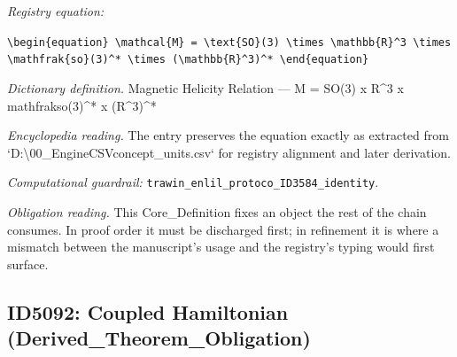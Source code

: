 \documentclass[11pt]{article}
\theoremstyle{remark}
\begin{document}
\noindent\textit{Registry equation:}\par
{\small\texttt{\textbackslash{}begin\{equation\} \textbackslash{}mathcal\{M\} = \textbackslash{}text\{SO\}(3) \textbackslash{}times \textbackslash{}mathbb\{R\}\textasciicircum{}3 \textbackslash{}times \textbackslash{}mathfrak\{so\}(3)\textasciicircum{}* \textbackslash{}times (\textbackslash{}mathbb\{R\}\textasciicircum{}3)\textasciicircum{}* \textbackslash{}end\{equation\}}}\par\medskip
\noindent\textit{Dictionary definition.} Magnetic Helicity Relation --- M = SO(3) x R\textasciicircum{}3 x mathfrakso(3)\textasciicircum{}* x (R\textasciicircum{}3)\textasciicircum{}*\par\medskip
\noindent\textit{Encyclopedia reading.} The entry preserves the equation exactly as extracted from `D:\textbackslash{}00\_EngineCSVconcept\_units.csv` for registry alignment and later derivation.
\par\medskip\noindent\textit{Computational guardrail:} \texttt{trawin\_enlil\_protoco\_ID3584\_identity}.
\par\medskip\noindent\textit{Obligation reading.} This Core\_Definition fixes an object the rest of the chain consumes. In proof order it must be discharged first; in refinement it is where a mismatch between the manuscript's usage and the registry's typing would first surface.

\subsection{ID5092: Coupled Hamiltonian (Derived\_Theorem\_Obligation)}
\end{document}

